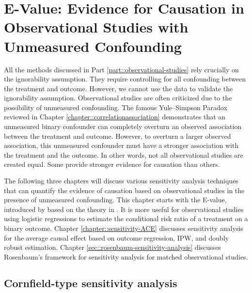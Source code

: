 
\chapter{E-Value: Evidence for Causation in Observational Studies with Unmeasured Confounding}
\label{chapter::evalue}


All the methods discussed in Part \ref{part::observational-studies}  rely crucially on the ignorability assumption. They require controlling for all confounding between the treatment and outcome. However, we cannot use the data to validate the ignorability assumption. Observational studies are often criticized due to the possibility of unmeasured confounding. The famous Yule--Simpson Paradox reviewed in Chapter \ref{chapter::correlationassociation} demonstrates that an unmeasured binary confounder can completely overturn an observed association between the treatment and outcome. However, to overturn a larger observed association, this unmeasured confounder must have a stronger association with the treatment and the outcome. In other words, not all observational studies are created equal. Some provide stronger evidence for causation than others. 


The following three chapters will discuss various sensitivity analysis techniques that can quantify the evidence of causation based on observational studies in the presence of unmeasured confounding. This chapter starts with the E-value, introduced by \citet{vanderweele2017sensitivity} based on the theory in \citet{ding2016sensitivity}. It is more useful for observational studies using logistic regressions to estimate the conditional risk ratio of a treatment on a binary outcome. Chapter \ref{chapter::sensitivity-ACE} discusses sensitivity analysis for the average causal effect based on outcome regression,  IPW, and doubly robust estimation.  Chapter \ref{sec::rosenbaum-sensitivity-analysis} discusses Rosenbaum's framework for sensitivity analysis for matched observational studies. 






\section{Cornfield-type sensitivity analysis}

